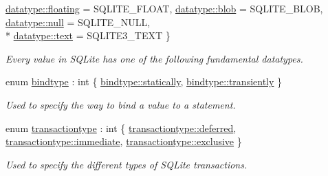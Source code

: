 \begin{DoxyCompactItemize}
\hyperlink{a00038_a7467e5cdd32bbf7fce35aced88682dc0a374515b23d6f106696387776a6077d17}{datatype\-::floating} = S\-Q\-L\-I\-T\-E\-\_\-\-F\-L\-O\-A\-T, 
\hyperlink{a00038_a7467e5cdd32bbf7fce35aced88682dc0aee26908bf9629eeb4b37dac350f4754a}{datatype\-::blob} = S\-Q\-L\-I\-T\-E\-\_\-\-B\-L\-O\-B, 
\hyperlink{a00038_a7467e5cdd32bbf7fce35aced88682dc0a37a6259cc0c1dae299a7866489dff0bd}{datatype\-::null} = S\-Q\-L\-I\-T\-E\-\_\-\-N\-U\-L\-L, 
\\*
\hyperlink{a00038_a7467e5cdd32bbf7fce35aced88682dc0a1cb251ec0d568de6a929b520c4aed8d1}{datatype\-::text} = S\-Q\-L\-I\-T\-E3\-\_\-\-T\-E\-X\-T
 \}
\begin{DoxyCompactList}\small\item\em Every value in S\-Q\-Lite has one of the following fundamental datatypes. \end{DoxyCompactList}\item 
enum \hyperlink{a00038_ae6a0fc429d821cca9a1b01d36cb0991d}{bindtype} \-: int \{ \hyperlink{a00038_ae6a0fc429d821cca9a1b01d36cb0991da29adf7ed88000fbb825808cb1d3667fa}{bindtype\-::statically}, 
\hyperlink{a00038_ae6a0fc429d821cca9a1b01d36cb0991dad51ecd4c7c8454ddc870989523c01d4b}{bindtype\-::transiently}
 \}
\begin{DoxyCompactList}\small\item\em Used to specify the way to bind a value to a statement. \end{DoxyCompactList}\item 
enum \hyperlink{a00038_a6b830ddde90f9bf8b2b59b395a66ceb8}{transactiontype} \-: int \{ \hyperlink{a00038_a6b830ddde90f9bf8b2b59b395a66ceb8a43fff3df3fc0b3417c86dc3040fb2d86}{transactiontype\-::deferred}, 
\hyperlink{a00038_a6b830ddde90f9bf8b2b59b395a66ceb8a516ff1e73f558b0ae701ae4561a63e2c}{transactiontype\-::immediate}, 
\hyperlink{a00038_a6b830ddde90f9bf8b2b59b395a66ceb8aa4293995cfbfa9ce60ce71ade2ff75f7}{transactiontype\-::exclusive}
 \}
\begin{DoxyCompactList}\small\item\em Used to specify the different types of S\-Q\-Lite transactions. \end{DoxyCompactList}\end{DoxyCompactItemize}
